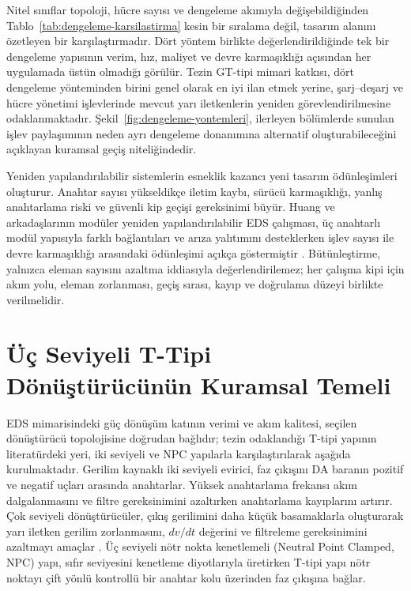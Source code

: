 Nitel sınıflar topoloji, hücre sayısı ve dengeleme akımıyla değişebildiğinden Tablo~\ref{tab:dengeleme-karsilastirma} kesin bir sıralama değil, tasarım alanını özetleyen bir karşılaştırmadır. Dört yöntem birlikte değerlendirildiğinde tek bir dengeleme yapısının verim, hız, maliyet ve devre karmaşıklığı açısından her uygulamada üstün olmadığı görülür. Tezin GT-tipi mimari katkısı, dört dengeleme yönteminden birini genel olarak en iyi ilan etmek yerine, şarj--deşarj ve hücre yönetimi işlevlerinde mevcut yarı iletkenlerin yeniden görevlendirilmesine odaklanmaktadır. Şekil~\ref{fig:dengeleme-yontemleri}, ilerleyen bölümlerde sunulan işlev paylaşımının neden ayrı dengeleme donanımına alternatif oluşturabileceğini açıklayan kuramsal geçiş niteliğindedir.

Yeniden yapılandırılabilir sistemlerin esneklik kazancı yeni tasarım ödünleşimleri oluşturur. Anahtar sayısı yükseldikçe iletim kaybı, sürücü karmaşıklığı, yanlış anahtarlama riski ve güvenli kip geçişi gereksinimi büyür. Huang ve arkadaşlarının modüler yeniden yapılandırılabilir EDS çalışması, üç anahtarlı modül yapısıyla farklı bağlantıları ve arıza yalıtımını desteklerken işlev sayısı ile devre karmaşıklığı arasındaki ödünleşimi açıkça göstermiştir \citep{Huang2024}. Bütünleştirme, yalnızca eleman sayısını azaltma iddiasıyla değerlendirilemez; her çalışma kipi için akım yolu, eleman zorlanması, geçiş sırası, kayıp ve doğrulama düzeyi birlikte verilmelidir.

\section{Üç Seviyeli T-Tipi Dönüştürücünün Kuramsal Temeli}

EDS mimarisindeki güç dönüşüm katının verimi ve akım kalitesi, seçilen dönüştürücü topolojisine doğrudan bağlıdır; tezin odaklandığı T-tipi yapının literatürdeki yeri, iki seviyeli ve NPC yapılarla karşılaştırılarak aşağıda kurulmaktadır. Gerilim kaynaklı iki seviyeli evirici, faz çıkışını DA baranın pozitif ve negatif uçları arasında anahtarlar. Yüksek anahtarlama frekansı akım dalgalanmasını ve filtre gereksinimini azaltırken anahtarlama kayıplarını artırır. Çok seviyeli dönüştürücüler, çıkış gerilimini daha küçük basamaklarla oluşturarak yarı iletken gerilim zorlanmasını, $dv/dt$ değerini ve filtreleme gereksinimini azaltmayı amaçlar \citep{Mohan2003,Holmes2003}. Üç seviyeli nötr nokta kenetlemeli (Neutral Point Clamped, NPC) yapı, sıfır seviyesini kenetleme diyotlarıyla üretirken T-tipi yapı nötr noktayı çift yönlü kontrollü bir anahtar kolu üzerinden faz çıkışına bağlar.

